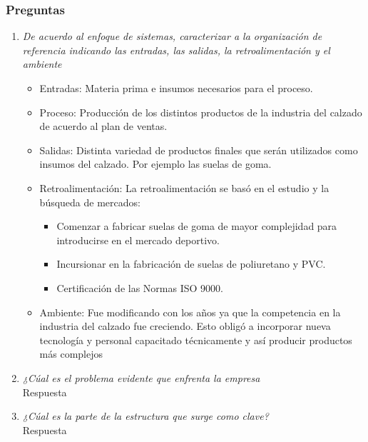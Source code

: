 \documentclass[a4paper,10pt]{article}
\begin{document}
	\subsubsection{Preguntas}
	
	\begin{enumerate}
		
			\item \textit{ De acuerdo al enfoque de sistemas, caracterizar a la organización de referencia indicando las entradas, las salidas, la retroalimentación y el ambiente}\\
			
			
			\begin{itemize}
			\item Entradas:
			Materia prima e insumos necesarios para el proceso.
			\item Proceso:
			Producción de los distintos productos de la industria del calzado de acuerdo al plan de ventas.
			\item Salidas:
			Distinta variedad de productos finales que serán utilizados como insumos del calzado. Por ejemplo las suelas de goma.
			\item Retroalimentación:
			La retroalimentación se basó en el estudio y la búsqueda de mercados:
			\begin{itemize}
		
		
			\item Comenzar a fabricar suelas de goma de mayor complejidad para introducirse en el mercado deportivo.
			\item 	Incursionar en la fabricación de suelas de poliuretano y PVC.
			\item Certificación de las Normas ISO 9000.
			\end{itemize}
			\item Ambiente:
			Fue modificando con los años ya que la competencia en la industria del calzado fue creciendo. Esto obligó a incorporar nueva tecnología y personal capacitado técnicamente y así producir productos más complejos
			
			\end{itemize}		
			
			\item \textit{¿Cúal es el problema evidente que enfrenta la empresa}\\
			Respuesta			
			
			\item \textit{¿Cúal es la parte de la estructura que surge como clave?}\\
			Respuesta
			

\end{enumerate}
\end{document}
